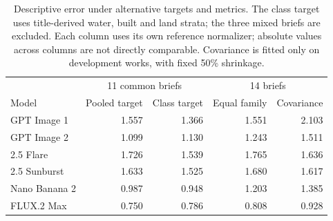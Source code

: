 \begin{table}[htbp]\centering\small
\begin{tabular}{@{}lrrrr@{}}\toprule
 & \multicolumn{2}{c}{11 common briefs} & \multicolumn{2}{c}{14 briefs}\\
Model & Pooled target & Class target & Equal family & Covariance\\\midrule
GPT Image 1 & 1.557 & 1.366 & 1.551 & 2.103\\
GPT Image 2 & 1.099 & 1.130 & 1.243 & 1.511\\
2.5 Flare & 1.726 & 1.539 & 1.765 & 1.636\\
2.5 Sunburst & 1.633 & 1.525 & 1.680 & 1.617\\
Nano Banana 2 & 0.987 & 0.948 & 1.203 & 1.385\\
FLUX.2 Max & 0.750 & 0.786 & 0.808 & 0.928\\
\bottomrule\end{tabular}
\caption{Descriptive error under alternative targets and metrics. The class target uses title-derived water, built and land strata; the three mixed briefs are excluded. Each column uses its own reference normalizer; absolute values across columns are not directly comparable. Covariance is fitted only on development works, with fixed 50\% shrinkage.}
\label{tab:review-targets}\end{table}
